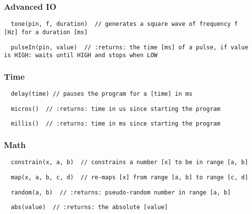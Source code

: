 \subsubsection*{Advanced \ac{IO}}
\begin{verbatim}
  tone(pin, f, duration)  // generates a square wave of frequency f [Hz] for a duration [ms]
\end{verbatim}
\vspace*{-2ex}
\begin{verbatim}
  pulseIn(pin, value)  // :returns: the time [ms] of a pulse, if value is HIGH: waits until HIGH and stops when LOW
\end{verbatim}
\subsubsection*{Time}
\begin{verbatim}
  delay(time) // pauses the program for a [time] in ms
\end{verbatim}
\vspace*{-2ex}
\begin{verbatim}
  micros()  // :returns: time in us since starting the program 
\end{verbatim}
\vspace*{-2ex}
\begin{verbatim}
  millis()  // :returns: time in ms since starting the program 
\end{verbatim}
\subsubsection*{Math}
\begin{verbatim}
  constrain(x, a, b)  // constrains a number [x] to be in range [a, b]
\end{verbatim}
\vspace*{-2ex}
\begin{verbatim}
  map(x, a, b, c, d)  // re-maps [x] from range [a, b] to range [c, d]
\end{verbatim}
\vspace*{-2ex}
\begin{verbatim}
  random(a, b)  // :returns: pseudo-random number in range [a, b]
\end{verbatim}
\vspace*{-2ex}
\begin{verbatim}
  abs(value)  // :returns: the absolute [value]
\end{verbatim}
